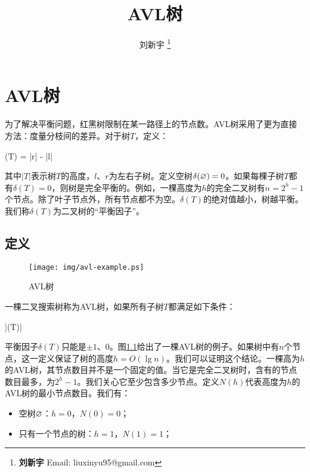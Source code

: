 \documentclass[b5paper]{ctexart}
\begin{document}
\title{AVL树}

\author{刘新宇
\thanks{{\bfseries 刘新宇} \newline
  Email: liuxinyu95@gmail.com \newline}
  }

\maketitle
\fi


\ifx\wholebook\relax
\chapter{AVL树}
\fi

\label{introduction}

为了解决平衡问题，红黑树限制在某一路径上的节点数。AVL树采用了更为直接方法：度量分枝间的差异。对于树$T$，定义：

\be
  \delta(T) = |r| - |l|
\ee

其中$|T|$表示树$T$的高度，$l$、$r$为左右子树。定义空树$\delta(\varnothing) = 0$。如果每棵子树$T$都有$\delta(T) = 0$，则树是完全平衡的。例如，一棵高度为$h$的完全二叉树有$n = 2^h - 1$个节点。除了叶子节点外，所有节点都不为空。$\delta(T)$的绝对值越小，树越平衡。我们称$\delta(T)$为二叉树的“平衡因子”。

\section{定义}

\begin{figure}[htbp]
   \centering
   \texttt{[image: img/avl-example.ps]}
   \caption{AVL树} \label{fig:avl-example}
\end{figure}

一棵二叉搜索树称为AVL树，如果所有子树$T$都满足如下条件：

\be
  |\delta(T)| 
  \label{eq:avl-rule}
\ee

平衡因子$\delta(T)$只能是$\pm 1$、0。图\ref{fig:avl-example}给出了一棵AVL树的例子。如果树中有$n$个节点，这一定义保证了树的高度$h = O(\lg n)$。我们可以证明这个结论。一棵高为$h$的AVL树，其节点数目并不是一个固定的值。当它是完全二叉树时，含有的节点数目最多，为$2^h - 1$。我们关心它至少包含多少节点。定义$N(h)$代表高度为$h$的AVL树的最小节点数目。我们有：

\begin{itemize}
\item 空树$\varnothing$：$h = 0$，$N(0) = 0$；
\item 只有一个节点的树：$h = 1$，$N(1) = 1$；
\end{itemize}
\end{document}
